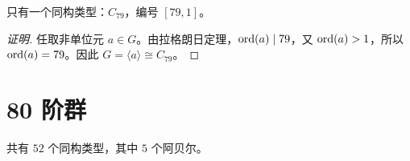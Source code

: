 \documentclass[UTF8,fontset=fandol,11pt,a4paper]{ctexart}
\begin{document}
只有一个同构类型：$C_{79}$，编号 $[79,1]$。

\begin{proof}[证明]
任取非单位元 $a\in G$。由拉格朗日定理，$\operatorname{ord}(a)\mid 79$，又 $\operatorname{ord}(a)>1$，所以 $\operatorname{ord}(a)=79$。因此 $G=\langle a\rangle\cong C_{79}$。
\end{proof}

\section*{80 阶群}\label{order:80}

共有 $52$ 个同构类型，其中 $5$ 个阿贝尔。

\begingroup\small\setlength{\tabcolsep}{3pt}\renewcommand{\arraystretch}{1.12}
\end{document}

